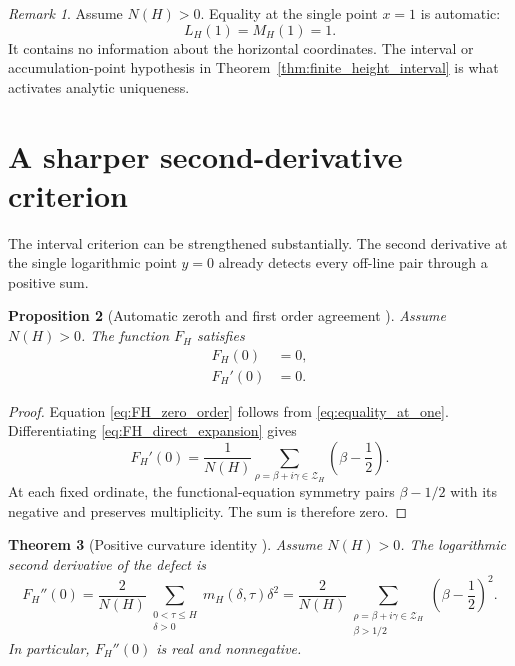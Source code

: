 \documentclass[11pt]{amsart}
\numberwithin{equation}{section}
\theoremstyle{plain}
\newtheorem{theorem}{Theorem}[section]
\newtheorem{proposition}[theorem]{Proposition}
\theoremstyle{definition}
\theoremstyle{remark}
\newtheorem{remark}[theorem]{Remark}
\begin{document}
\begin{remark}
\label{rem:single_point_insufficient}
Assume $N(H)>0$.
Equality at the single point $x=1$ is automatic:
\begin{equation}
L_H(1)=M_H(1)=1.
\label{eq:equality_at_one}
\end{equation}
It contains no information about the horizontal coordinates.  The interval or accumulation-point hypothesis in Theorem~\ref{thm:finite_height_interval} is what activates analytic uniqueness.
\end{remark}

\section{A sharper second-derivative criterion}
\label{sec:second_derivative}

The interval criterion can be strengthened substantially.  The second derivative at the single logarithmic point $y=0$ already detects every off-line pair through a positive sum.

\begin{proposition}[Automatic zeroth and first order agreement {\normalfont[Unconditional]}]
\label{prop:automatic_orders}
Assume $N(H)>0$.
The function $F_H$ satisfies
\begin{align}
F_H(0)&=0,
\label{eq:FH_zero_order}
\\
F_H'(0)&=0.
\label{eq:FH_first_order}
\end{align}
\end{proposition}

\begin{proof}
Equation \eqref{eq:FH_zero_order} follows from \eqref{eq:equality_at_one}.  Differentiating \eqref{eq:FH_direct_expansion} gives
\begin{equation}
F_H'(0)
=
\frac{1}{N(H)}
\sum_{\rho=\beta+i\gamma\in\mathcal Z_H}
\left(\beta-\frac12\right).
\label{eq:FH_first_derivative_sum}
\end{equation}
At each fixed ordinate, the functional-equation symmetry pairs $\beta-1/2$ with its negative and preserves multiplicity.  The sum is therefore zero.
\end{proof}

\begin{theorem}[Positive curvature identity {}]
\label{thm:positive_curvature}
Assume $N(H)>0$.
The logarithmic second derivative of the defect is
\begin{equation}
\boxed{
F_H''(0)
=
\frac{2}{N(H)}
\sum_{\substack{0<\tau\leq H\\\delta>0}}
m_H(\delta,\tau)\delta^2
=
\frac{2}{N(H)}
\sum_{\substack{\rho=\beta+i\gamma\in\mathcal Z_H\\\beta>1/2}}
\left(\beta-\frac12\right)^2.
}
\label{eq:positive_curvature_identity}
\end{equation}
In particular, $F_H''(0)$ is real and nonnegative.
\end{theorem}
\end{document}
